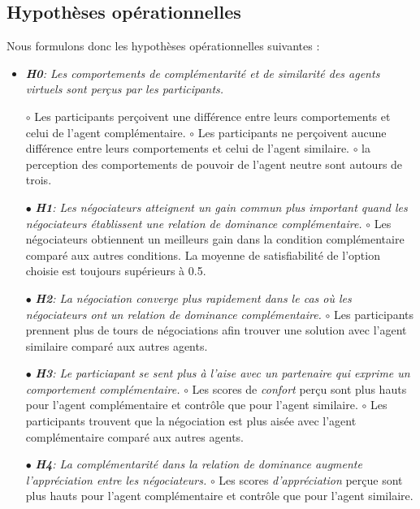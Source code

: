 	\subsection{Hypothèses opérationnelles}
		Nous formulons donc les hypothèses opérationnelles suivantes :
		\begin{itemize}
			\item\textit{\textbf{H0}: Les comportements de complémentarité et de similarité des agents virtuels sont perçus par les participants.}
				
				\subitem $\circ$  Les participants perçoivent une différence entre leurs comportements et celui de l'agent complémentaire.
				\subitem $\circ$ Les participants ne perçoivent aucune différence entre leurs comportements et celui de l'agent similaire.
				\subitem $\circ$ la perception des comportements de pouvoir de l'agent neutre sont autours de trois. 
			\item [$\bullet$]\textit{ \textbf{H1}: Les négociateurs atteignent un gain commun plus important quand les négociateurs établissent une relation de dominance complémentaire.}
				\subitem $\circ$ Les négociateurs obtiennent un meilleurs gain dans la condition complémentaire comparé aux autres conditions. La moyenne de satisfiabilité de l'option choisie est toujours supérieurs à 0.5. 
				 
			\item [$\bullet$] \textit{\textbf{H2}: La négociation converge plus rapidement dans le cas où les négociateurs ont un relation de dominance complémentaire.}
				\subitem $\circ$ Les participants prennent plus de tours de négociations afin trouver une solution avec l'agent similaire comparé aux autres agents.


			\item [$\bullet$] \textit{\textbf{H3}: Le particiapant se sent plus à l'aise avec un partenaire qui exprime un comportement complémentaire.}
				\subitem $\circ$ Les scores de \emph{confort} perçu sont plus hauts pour l'agent complémentaire et contrôle que pour l'agent similaire.
				\subitem $\circ$ Les participants trouvent que la négociation est plus aisée avec l'agent complémentaire comparé aux autres agents.
			\item [$\bullet$] \textit{\textbf{H4}: La complémentarité dans la relation de dominance augmente l'appréciation entre les négociateurs.}
				\subitem $\circ$ Les scores \emph{d'appréciation} perçue sont plus hauts pour l'agent complémentaire et contrôle que pour l'agent similaire.
			
		\end{itemize}

